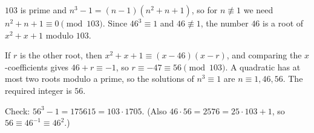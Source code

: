$103$ is prime and $n^3-1=(n-1)\left(n^2+n+1\right)$, so for $n\not\equiv1$ we need $n^2+n+1\equiv0\pmod{103}$. Since $46^3\equiv1$ and $46\not\equiv1$, the number $46$ is a root of $x^2+x+1$ modulo $103$.

If $r$ is the other root, then $x^2+x+1\equiv(x-46)(x-r)$, and comparing the $x$-coefficients gives $46+r\equiv-1$, so $r\equiv-47\equiv56\pmod{103}$. A quadratic has at most two roots modulo a prime, so the solutions of $n^3\equiv1$ are $n\equiv1,46,56$. The required integer is $\boxed{56}$.

Check: $56^3-1=175615=103\cdot1705$. (Also $46\cdot56=2576=25\cdot103+1$, so $56\equiv46^{-1}\equiv46^2$.)
